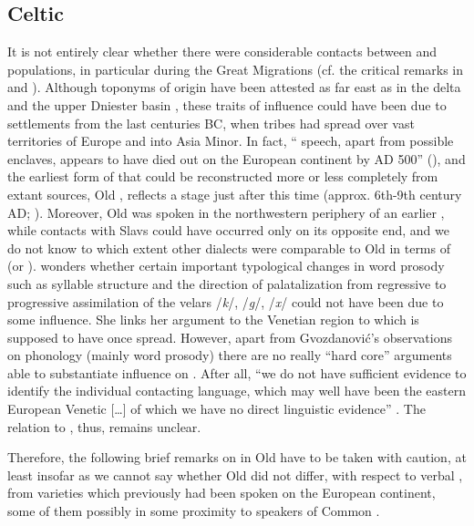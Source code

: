 \documentclass[output=paper]{langsci/langscibook}
\begin{document}
\subsection{Celtic}\label{sec:wiemerserzant:5.2}

It is not entirely clear whether there were considerable contacts between  and  populations, in particular during the Great Migrations (cf. the critical remarks in \citealt[64--69]{Polomé1972} and \citealt[48]{Andersen2003}). Although toponyms of  origin have been attested as far east as in the  delta and the upper Dniester basin \citep{Blažek2015}, these traits of  influence could have been due to settlements from the last centuries BC, when  tribes had spread over vast territories of Europe and into Asia Minor. In fact, “ speech, apart from possible enclaves, appears to have died out on the European continent by AD 500” (\citealt[2]{MacAulay1992}), and the earliest form of  that could be reconstructed more or less completely from extant sources, Old , reflects a stage just after this time (approx. 6th-9th century AD; \citealt[1--11]{Thurneysen1975[1946]}). Moreover, Old  was spoken in the northwestern periphery of an earlier  , while contacts with Slavs could have occurred only on its opposite end, and we do not know to which extent other  dialects were comparable to Old  in terms of  (or ). \citet{Gvozdanović2009,Gvozdanović2015} wonders whether certain important typological changes in word prosody such as syllable structure and the direction of palatalization from regressive to progressive assimilation of the velars /\textit{k}/, /\textit{g}/, /\textit{x}/ could not have been due to some  influence. She links her argument to the Venetian region to which  is supposed to have once spread. However, apart from Gvozdanović’s observations on phonology (mainly word prosody) there are no really “hard core” arguments able to substantiate  influence on . After all, “we do not have sufficient evidence to identify the individual contacting language, which may well have been the eastern European Venetic […] of which we have no direct linguistic evidence” \citep[97]{Gvozdanović2015}. The relation to , thus, remains unclear.

Therefore, the following brief remarks on  in Old  have to be taken with caution, at least insofar as we cannot say whether Old  did not differ, with respect to verbal , from  varieties which previously had been spoken on the European continent, some of them possibly in some proximity to speakers of Common .
\end{document}
